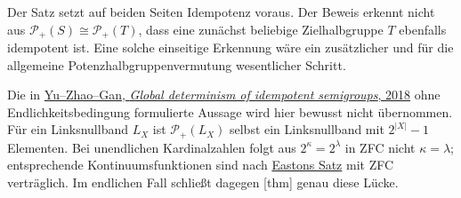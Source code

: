 \documentclass[main.tex]{subfiles}
\begin{document}
\begin{remark}
Der Satz setzt auf beiden Seiten Idempotenz voraus.  Der Beweis erkennt
nicht aus \(\mathcal P_+(S)\cong\mathcal P_+(T)\), dass eine zunächst
beliebige Zielhalbgruppe \(T\) ebenfalls idempotent ist.  Eine solche
einseitige Erkennung wäre ein zusätzlicher und für die allgemeine
Potenzhalbgruppenvermutung wesentlicher Schritt.

Die in
\href{https://doi.org/10.1080/00927872.2017.1319474}%
 {Yu--Zhao--Gan, \emph{Global determinism of idempotent semigroups}, 2018}
ohne Endlichkeitsbedingung formulierte Aussage wird hier bewusst nicht
übernommen.  Für ein Linksnullband \(L_X\) ist
\(\mathcal P_+(L_X)\) selbst ein Linksnullband mit
\(2^{|X|}-1\) Elementen.  Bei unendlichen Kardinalzahlen folgt aus
\(2^\kappa=2^\lambda\) in ZFC nicht \(\kappa=\lambda\); entsprechende
Kontinuumsfunktionen sind nach
\href{https://doi.org/10.1016/0003-4843(70)90012-4}%
 {Eastons Satz}
mit ZFC verträglich.  Im endlichen Fall schließt dagegen
[thm]
genau diese Lücke.
\end{remark}
\end{document}
